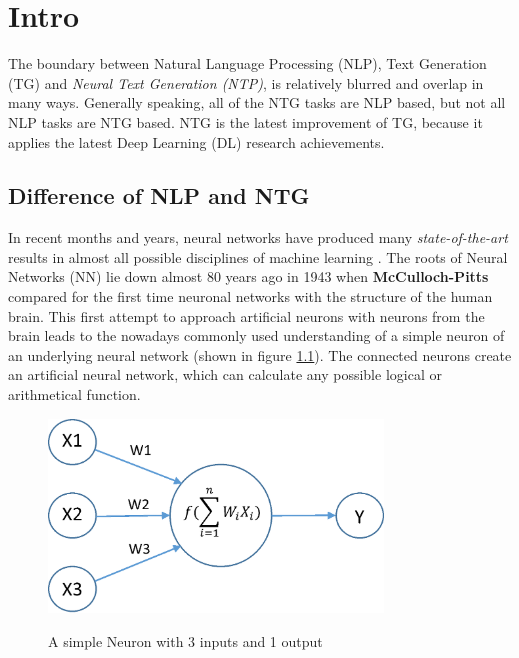 \chapter{Intro}\label{ch:intro}

The boundary between Natural Language Processing (NLP), Text Generation (TG) and \textit{Neural Text Generation (NTP)}, is relatively blurred and overlap in many ways. Generally speaking, all of the NTG tasks are NLP based, but not all NLP tasks are NTG based.
NTG is the latest improvement of TG, because it applies the latest Deep Learning (DL) research achievements.

\section{Difference of NLP and NTG}
In recent months and years, neural networks have produced many \textit{state-of-the-art} results in almost all possible disciplines of machine learning \cite{NTG2}. The roots of Neural Networks (NN) lie down almost 80 years ago in 1943 when \textbf{McCulloch-Pitts} \cite{NN} compared for the first time neuronal networks with the structure of the human brain. This first attempt to approach artificial neurons with neurons from the brain leads to the nowadays commonly used understanding of a simple neuron of an underlying neural network (shown in figure \ref{neuron}). The connected neurons create an artificial neural network, which can calculate any possible logical or arithmetical function. 

\begin{figure}
  \begin{center}
  \includegraphics[width=3.5in]{photos/neuron}\\
  \caption{A simple Neuron with 3 inputs and 1 output \cite{neuron}}\label{neuron}
  \end{center}
\end{figure}

